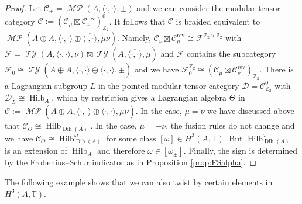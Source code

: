 \documentclass[twoside,11pt,reqno]{amsart}
\theoremstyle{definition}
\theoremstyle{remark}
\newcommand{\cF}{\mathcal{F}}
\newcommand{\cD}{\mathcal{D}}
\newcommand{\cC}{\mathcal{C}}
\newcommand{\TT}{\mathbb{T}}
\newcommand{\ZZ}{\mathbb{Z}}
\DeclareMathOperator{\Dih}{Dih}
\DeclareMathOperator*{\TY}{\mathcal{TY}}
\DeclareMathOperator*{\MP}{\mathcal{MP}}
\DeclareMathOperator{\Vect}{Hilb}
\newcommand{\bi}[2]{\langle #1,#2\rangle}
\newcommand{\rev}[1]{{#1}^\mathrm{rev}}
\newcommand{\bislotslot}{\bi\cdot\cdot}
\begin{document}
\begin{proof}
  Let 
  $\cC_\pm=\MP(A,\bislotslot,\pm)$ and we can consider the modular tensor category 
  $\cC:=(\cC_\mu\boxtimes\rev{\cC}_\nu)_{\ZZ_2}^0$.
  It follows that $\cC$ is braided equivalent to $\MP(A\oplus A,\bislotslot\oplus\overline{\bislotslot},\mu\nu)$.
  Namely, $\cC_\nu\boxtimes\rev{\cC}_{\mu}\cong \cF^{\ZZ_2\times\ZZ_2}$ with 
  $\cF=\TY(A,\bislotslot,\nu)\boxtimes\TY(A,\overline{\bislotslot},\mu)$ and $\cF$ contains the subcategory 
  $\cF_0\cong\TY(A\oplus A,\bislotslot\oplus\overline{\bislotslot},\pm)$
  and we have $\cF_0^{\ZZ_2}\cong (\cC_\mu\boxtimes\rev{\cC}_\nu)_{\ZZ_2}$. 
  There is a Lagrangian subgroup $L$ in the pointed modular tensor category
  $\cD=\cC_{\ZZ_2}^0$ with $\cD_{\hat L}\cong \Vect_A$, which by restriction gives a 
  Lagrangian algebra $\Theta$ in $\cC:=\MP(A\oplus A,\bislotslot\oplus\overline{\bislotslot},\mu\nu)$. 
  In the case, $\mu=\nu$ we have discussed above that
  $\cC_\Theta\cong \Vect_{\Dih(A)}$. 
  In the case, $\mu=-\nu$, the fusion rules do not change and we have 
  $\cC_\Theta\cong \Vect_{\Dih(A)}^\omega$ for some class 
  $[\omega]\in H^3(A,\TT)$.
  But $\Vect^\omega_{\Dih(A)}$ is an extension of $\Vect_A$ and therefore 
  $\omega\in[\omega_\pm]$. 
  Finally, the sign is determined by the Frobenius--Schur indicator as in
  Proposition \ref{prop:FSalpha}.
\end{proof}
The following example shows that we can also twist by certain elements in 
$H^3(A,\TT)$.
\end{document}
